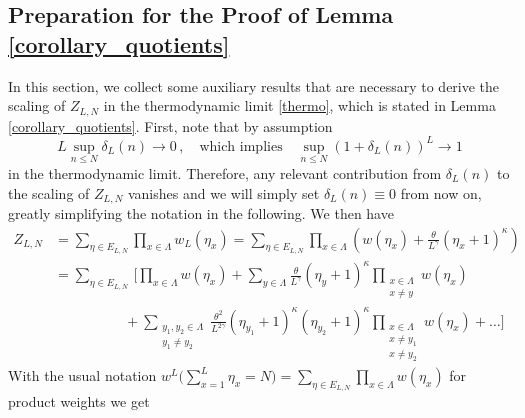 \documentclass[pdflatex,sn-mathphys-num]{sn-jnl}%
\theoremstyle{thmstyleone}%
\theoremstyle{thmstyletwo}%
\theoremstyle{thmstylethree}%
\begin{document}
\medskip
\subsection{Preparation for the Proof of Lemma \ref{corollary_quotients}}
\label{sec_prep_and_proof}

In this section, we collect some auxiliary results that are necessary to derive the scaling of $Z_{L, N}$ in the thermodynamic limit \eqref{thermo}, which is stated in Lemma \ref{corollary_quotients}. First, note that by assumption
\[
L\sup_{n\leq N} \delta_L (n)\to 0\,,\quad\mbox{which implies}\quad \sup_{n\leq N}(1+\delta_L (n))^L \to 1
\]
in the thermodynamic limit. 
Therefore, any relevant contribution from $\delta_L (n)$ to the scaling of $Z_{L,N}$ vanishes and we will simply set $\delta_L (n)\equiv 0$ from now on, greatly simplifying the notation in the following. We then have
\begin{equation*}
	\begin{aligned}
		Z_{L,N} 
		&= \sum_{\eta \in E_{L,N}} \prod_{x \in \Lambda} w_L(\eta_x)= \sum_{\eta \in E_{L,N}} \prod_{x \in \Lambda} \left( w(\eta_x) + \frac{\theta}{L^\gamma} (\eta_x+1)^\kappa \right) \\
		&=  \sum_{\eta \in E_{L,N}} \, \bigg[ \prod_{x \in \Lambda} w(\eta_x) + \sum_{y \in \Lambda} \frac{\theta}{L^\gamma} (\eta_y+1)^\kappa \prod_{\substack{x \in \Lambda \\ x \ne y}}w(\eta_x) \\
		&\qquad \qquad\quad +  \sum_{\substack{y_1, y_2 \in \Lambda \\ y_1 \ne y_2}} \frac{\theta^2}{L^{2\gamma}} (\eta_{y_1}+1)^\kappa (\eta_{y_2}+1)^\kappa \prod_{\substack{x \in \Lambda \\ x \ne y_1 \\ x \ne y_2}}w(\eta_x) + \dots \bigg]
	\end{aligned}
\end{equation*}
With the usual notation $w^L \Big(\sum\limits_{x=1}^L \eta_x =N\Big) =\sum\limits_{\eta \in E_{L,N}} \prod\limits_{x \in \Lambda} w(\eta_x)$ for product weights we get
\end{document}
